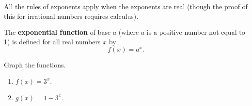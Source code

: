 \documentclass{book}
\begin{document}
All the rules of exponents apply when the exponents are real (though the proof of this for irrational numbers requires calculus).

\begin{Def} The \textbf{exponential function} of base $a$ (where $a$ is a positive number not equal to 1)  is defined for all real numbers $x$ by \[f(x) = a^x.\]\end{Def}\vs

\begin{Exam} Graph the functions.
\begin{enumerate}
\setlength{\columnsep}{75pt}
\item $\displaystyle{f(x) = 3^x}$.
\begin{center}
\end{center}

\item $\displaystyle{g(x) = 1 - 3^x}$.

\begin{center}
\end{center}
\end{enumerate}
\end{Exam}\vs
\end{document}
